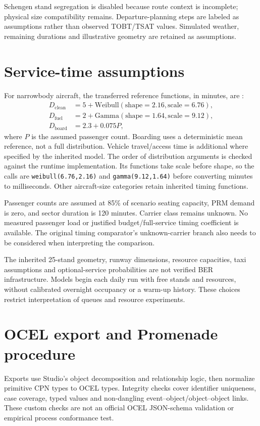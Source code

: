 Schengen stand segregation is disabled because route context is incomplete; physical size compatibility remains. Departure-planning steps are labeled as assumptions rather than observed TOBT/TSAT values. Simulated weather, remaining durations and illustrative geometry are retained as assumptions.

\section{Service-time assumptions}
For narrowbody aircraft, the transferred reference functions, in minutes, are \cite{schultz2012dynamic}:
\begin{align}
D_{\mathrm{clean}} &=5+\mathrm{Weibull}(\mathrm{shape}=2.16,\mathrm{scale}=6.76),\\
D_{\mathrm{fuel}} &=2+\mathrm{Gamma}(\mathrm{shape}=1.64,\mathrm{scale}=9.12),\\
D_{\mathrm{board}} &=2.3+0.075P,
\end{align}
where $P$ is the assumed passenger count. Boarding uses a deterministic mean reference, not a full distribution. Vehicle travel/access time is additional where specified by the inherited model. The order of distribution arguments is checked against the runtime implementation. Its functions take scale before shape, so the calls are \texttt{weibull(6.76,2.16)} and \texttt{gamma(9.12,1.64)} before converting minutes to milliseconds. Other aircraft-size categories retain inherited timing functions.

Passenger counts are assumed at 85\% of scenario seating capacity, PRM demand is zero, and sector duration is 120 minutes. Carrier class remains unknown. No measured passenger load or justified budget/full-service timing coefficient is available. The original timing comparator's unknown-carrier branch also needs to be considered when interpreting the comparison.

The inherited 25-stand geometry, runway dimensions, resource capacities, taxi assumptions and optional-service probabilities are not verified BER infrastructure. Models begin each daily run with free stands and resources, without calibrated overnight occupancy or a warm-up history. These choices restrict interpretation of queues and resource experiments.

\section{OCEL export and Promenade procedure}
Exports use Studio's object decomposition and relationship logic, then normalize primitive CPN types to OCEL types. Integrity checks cover identifier uniqueness, case coverage, typed values and non-dangling event--object/object--object links. These custom checks are not an official OCEL JSON-schema validation or empirical process conformance test.


